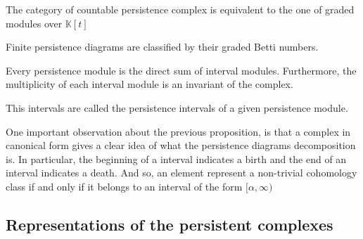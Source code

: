 \begin{proposition}\cite{zomcar2002}
The category of countable persistence complex is equivalent to the one of graded modules over
$\mathbb{K}[t]$
\end{proposition}

\begin{proposition}\cite{zomcar2002}
Finite persistence diagrams are classified by 
their graded Betti numbers.

\end{proposition}

\begin{proposition}\cite{zomcar2002}
Every persistence module is the direct sum of interval modules.
Furthermore, the multiplicity of each interval module is an invariant
of the complex.

This intervals are called the persistence intervals of a given 
persistence module.
\end{proposition}


One important observation about the previous proposition,
is that a complex in canonical form gives a clear idea of what the persistence 
diagrams decomposition is. In particular, the beginning of a interval
indicates a birth and the end of an interval indicates a death. And
so, an element represent a non-trivial cohomology class if and only if
it belongs to an interval of the form $[\alpha,\infty)$

\subsection{Representations of the persistent complexes}

%


%

%
%



